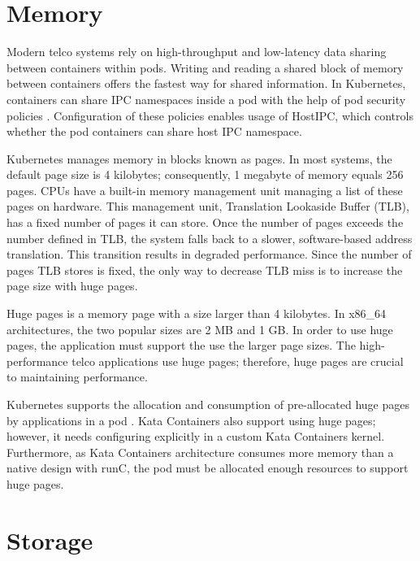 \section{Memory}

Modern telco systems rely on high-throughput and low-latency data sharing between containers within pods. Writing and reading a shared block of memory between containers offers the fastest way for shared information. In Kubernetes, containers can share IPC namespaces inside a pod with the help of pod security policies \cite{PodSecurityPolicyKubernetes}. Configuration of these policies enables usage of HostIPC, which controls whether the pod containers can share host IPC namespace.

Kubernetes manages memory in blocks known as pages. In most systems, the default page size is 4 kilobytes; consequently, 1 megabyte of memory equals 256 pages. CPUs have a built-in memory management unit managing a list of these pages on hardware. This management unit, Translation Lookaside Buffer (TLB), has a fixed number of pages it can store. Once the number of pages exceeds the number defined in TLB, the system falls back to a slower, software-based address translation. This transition results in degraded performance. Since the number of pages TLB stores is fixed, the only way to decrease TLB miss is to increase the page size with huge pages. \cite{HugePagesOpenShift}

Huge pages is a memory page with a size larger than 4 kilobytes. In x86\_64 architectures, the two popular sizes are 2 MB and 1 GB. In order to use huge pages, the application must support the use the larger page sizes. The high-performance telco applications use huge pages; therefore, huge pages are crucial to maintaining performance.

Kubernetes supports the allocation and consumption of pre-allocated huge pages by applications in a pod \cite{HugePagesKubernetes}. Kata Containers also support using huge pages; however, it needs configuring explicitly in a custom Kata Containers kernel. Furthermore, as Kata Containers architecture consumes more memory than a native design with runC, the pod must be allocated enough resources to support huge pages.

\section{Storage}

